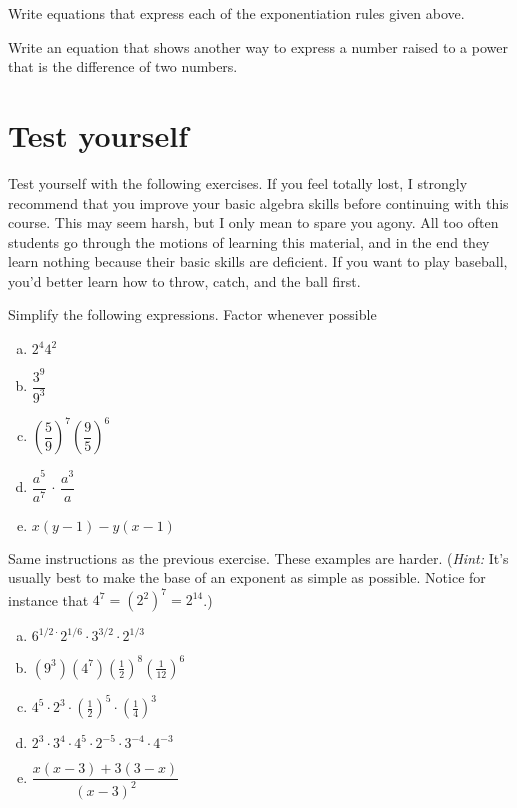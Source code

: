 \begin{exercise}\label{exercise:BeforeWeBegin:5}
Write equations that express each of the exponentiation rules given above.
\end{exercise}
\begin{exercise}\label{exercise:BeforeWeBegin:6}
Write an equation that shows another way to express a number raised to a power that is the difference of two numbers.
\end{exercise}

\section{Test yourself}
Test yourself with the following exercises. If you feel totally lost, I strongly recommend that you improve your basic algebra skills before continuing with this course. This may seem harsh, but I only mean to spare you agony. All too often students go through the motions of learning this material, and in the end they learn nothing because their basic skills are deficient. If you want to play baseball, you'd better learn how to throw, catch, and  the ball first.

\begin{exercise}\label{exercise:BeforeWeBegin:7}
Simplify the following expressions. Factor whenever possible
\begin{multicols}{2}
\begin{enumerate}[(a)]
\item
$ 2^4 4^2$
\item
$ \dfrac{3^9}{9^3}$
\item
$\left( \dfrac{5}{9} \right)^7 \left( \dfrac{9}{5} \right)^6$
\item
$\dfrac{a^5}{a^7} \, \cdot \, \dfrac{a^3}{a}$
\item
$x(y-1) - y(x-1)$
\end{enumerate}
\end{multicols}
\end{exercise}


\begin{exercise}\label{exercise:BeforeWeBegin:8}
Same instructions as the previous exercise. These examples are  harder. (\emph{Hint:} It's usually best to make the base of an exponent as simple as possible. Notice for instance that $4^7 = (2^2)^7 = 2^{14}$.)
\begin{multicols}{2}
\begin{enumerate}[(a)]
\item
$6^{1/2\cdot}2^{1/6}\cdot3^{3/2}\cdot2^{1/3}$
\item
$(9^3)(4^7)\left(\frac{1}{2}\right)^8\left(\frac{1}{12}\right)^6$
\item
$4^5 \cdot 2^3 \cdot \left(\frac{1}{2}\right)^5 \cdot \left( \frac{1}{4} \right) ^3$
\item
$2^3 \cdot 3^4 \cdot 4^5 \cdot 2^{-5} \cdot 3^{-4} \cdot 4^{-3}$
\item
$\dfrac{x(x-3)+3(3-x)}{(x-3)^2}$
\end{enumerate}
\end{multicols}
\end{exercise}


